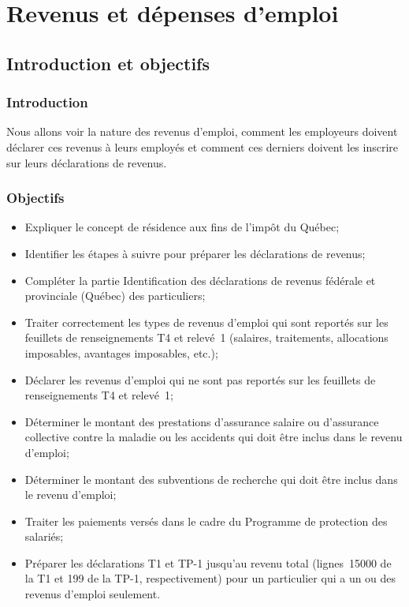 \chapter{Revenus et dépenses d'emploi}
\section{Introduction et objectifs}
\subsection{Introduction}
Nous allons voir la nature des revenus d'emploi, comment les employeurs doivent déclarer ces revenus à leurs employés et comment ces derniers doivent les inscrire sur leurs déclarations de revenus.


\subsection{Objectifs}
\begin{itemize}[label=]
	\item Expliquer le concept de résidence aux fins de l'impôt du Québec; 
	\item Identifier les étapes à suivre pour préparer les déclarations de revenus;
	\item Compléter la partie \og Identification\fg{} des déclarations de revenus fédérale et provinciale (Québec) des particuliers;
	\item Traiter correctement les types de revenus d'emploi qui sont reportés sur les feuillets de renseignements T4 et relevé~1 (salaires, traitements, allocations imposables, avantages imposables, etc.);
	\item Déclarer les revenus d'emploi qui ne sont pas reportés sur les feuillets de renseignements T4 et relevé~1;
	\item Déterminer le montant des prestations d'assurance salaire ou d'assurance collective contre la maladie ou les accidents qui doit être inclus dans le revenu d'emploi;
	\item Déterminer le montant des subventions de recherche qui doit être inclus dans le revenu d'emploi;
	\item Traiter les paiements versés dans le cadre du Programme de protection des salariés;
	\item Préparer les déclarations T1 et TP-1 jusqu'au revenu total (lignes~15000 de la T1 et 199 de la TP-1, respectivement) pour un particulier qui a un ou des revenus d'emploi seulement.
\end{itemize}


